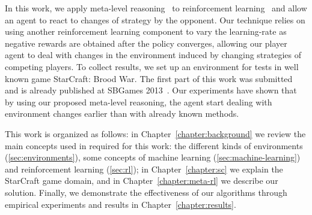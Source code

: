 In this work, we apply meta-level reasoning~\cite{cox2007metareasoning,ulam2008combining} to reinforcement learning~\cite{schweighofer2003meta} and allow an agent to react to changes of strategy by the opponent.
Our technique relies on using another reinforcement learning component to vary the learning-rate as negative rewards are obtained after the policy converges, allowing our player agent to deal with changes in the environment induced by changing strategies of competing players.
To collect results, we set up an environment for tests in well known game StarCraft: Brood War.
The first part of this work was submitted and is already published at SBGames 2013~\cite{mypaper}.
Our experiments have shown that by using our proposed meta-level reasoning, the agent start dealing with environment changes earlier than with already known methods.

This work is organized as follows: 
in Chapter~\ref{chapter:background} we review the main concepts used in required for this work:
the different kinds of environments (\ref{sec:environments}), some concepts of machine learning (\ref{sec:machine-learning}) and reinforcement learning (\ref{sec:rl}); 
in Chapter~\ref{chapter:sc} we explain the StarCraft game domain, and in Chapter~\ref{chapter:meta-rl} we describe our solution.
Finally, we demonstrate the effectiveness of our algorithms through empirical experiments and results in Chapter~\ref{chapter:results}.